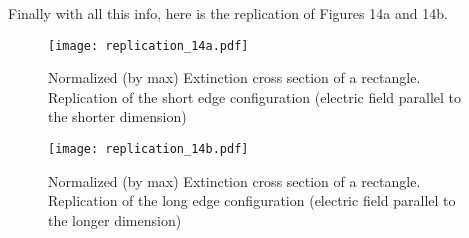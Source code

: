  Finally with all this info, here is the replication of Figures 14a and 14b. 

 \begin{figure}
    \centering
    \texttt{[image: replication\_14a.pdf]} 
    \caption{Normalized (by max) Extinction cross section of a rectangle. Replication of 
    the short edge configuration (electric field parallel to the shorter dimension)}
    \label{fig:rep_14a}
 \end{figure}

 \begin{figure}
    \centering
    \texttt{[image: replication\_14b.pdf]} 
    \caption{Normalized (by max) Extinction cross section of a rectangle. Replication of the 
    long edge configuration (electric field parallel to the longer dimension)}
    \label{fig:rep_14b}
 \end{figure}
